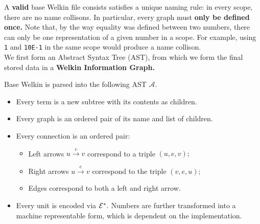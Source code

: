 A \textbf{valid} base Welkin file consists satisfies a unique naming rule: in every scope, there are no name collisons. In particular, every graph must \textbf{only be defined once.} Note that, by the way equality was defined between two numbers,
  there can only be one representation of a given number in a scope. For example, using \texttt{1} and \texttt{10E-1} in the same scope would produce a name collison.
\\ We first form an Abstract Syntax Tree (AST), from which we form the final stored data in a \textbf{Welkin Information Graph.}
\begin{definition}
  Base Welkin is parsed into the following AST $\mathcal{A}.$
  \begin{itemize}
	\item Every term is a new subtree with its contents as children.
    \item Every graph is an ordered pair of its name and list of children.
    \item Every connection is an ordered pair:
		  \begin{itemize}
			\item Left arrows $u \xrightarrow{e} v$ correspond to a triple $(u, e, v);$
			\item Right arrows $u \xrightarrow{e} v$ correspond to the triple $(v, e, u);$
			\item Edges correspond to both a left and right arrow.
		  \end{itemize}
	\item Every unit is encoded via $\mathcal{E}^{*}.$ Numbers are further transformed into a machine representable form, which is dependent on the implementation.
  \end{itemize}
 \end{definition}




